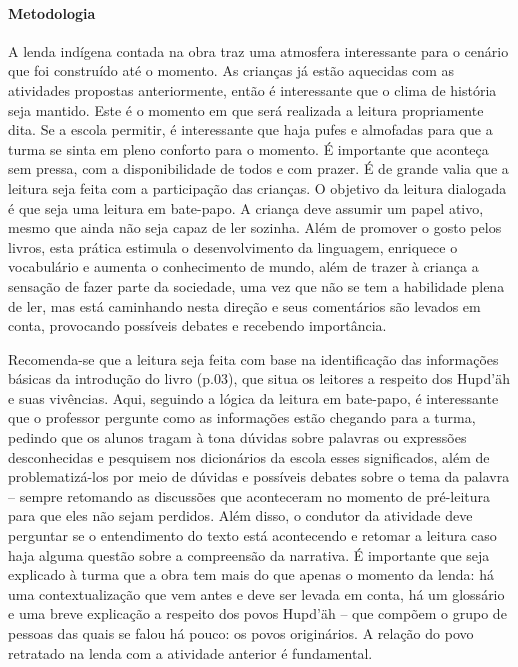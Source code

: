 \documentclass[11pt]{extarticle}
\begin{document}
\paragraph{Metodologia} A lenda indígena contada na obra traz uma atmosfera interessante para o cenário que foi construído até o momento. As crianças já estão aquecidas com as atividades propostas anteriormente, então é interessante que o clima de história seja mantido. Este é o momento em que será realizada a leitura propriamente dita. Se a escola permitir, é interessante que haja pufes e almofadas para que a turma se sinta em pleno conforto para o momento. É importante que aconteça sem pressa, com a disponibilidade de todos e com prazer. É de grande valia que a leitura seja feita com a participação das crianças. O objetivo da leitura dialogada é que seja uma leitura em bate-papo. A criança deve assumir um papel ativo, mesmo que ainda não seja capaz de ler sozinha. Além de promover o gosto pelos livros, esta prática estimula o desenvolvimento da linguagem, enriquece o vocabulário e aumenta o conhecimento de mundo, além de trazer à criança a sensação de fazer parte da sociedade, uma vez que não se tem a habilidade plena de ler, mas está caminhando nesta direção e seus comentários são levados em conta, provocando possíveis debates e recebendo importância. 



Recomenda-se que a leitura seja feita com base na identificação das informações básicas da introdução do livro (p.03), que situa os leitores a respeito dos Hupd'äh e suas vivências. Aqui, seguindo a lógica da leitura em bate-papo, é interessante que o professor pergunte como as informações estão chegando para a turma, pedindo que os alunos tragam à tona dúvidas sobre palavras ou expressões desconhecidas e pesquisem nos dicionários da escola esses significados, além de problematizá-los por meio de dúvidas e possíveis debates sobre o tema da palavra -- sempre retomando as discussões que aconteceram no momento de pré-leitura para que eles não sejam perdidos. Além disso, o condutor da atividade deve perguntar se o entendimento do texto está acontecendo e retomar a leitura caso haja alguma questão sobre a compreensão da narrativa. É importante que seja explicado à turma que a obra tem mais do que apenas o momento da lenda: há uma contextualização que vem antes e deve ser levada em conta, há um glossário e uma breve explicação a respeito dos povos Hupd'äh -- que compõem o grupo de pessoas das quais se falou há pouco: os povos originários. A relação do povo retratado na lenda com a atividade anterior é fundamental.
\end{document}

